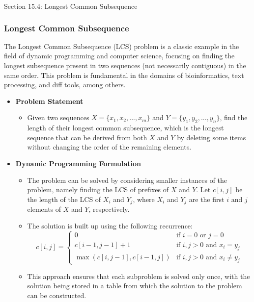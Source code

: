 \begin{notes}{Section 15.4: Longest Common Subsequence}
    \subsubsection*{Longest Common Subsequence}

    The Longest Common Subsequence (LCS) problem is a classic example in the field of dynamic programming and computer science, focusing on finding the longest subsequence present in two sequences 
    (not necessarily contiguous) in the same order. This problem is fundamental in the domains of bioinformatics, text processing, and diff tools, among others.
    
    \begin{itemize}
        \item \textbf{Problem Statement}
        \begin{itemize}
            \item Given two sequences $X = \{x_1, x_2, ..., x_m\}$ and $Y = \{y_1, y_2, ..., y_n\}$, find the length of their longest common subsequence, which is the longest sequence that can be 
            derived from both $X$ and $Y$ by deleting some items without changing the order of the remaining elements.
        \end{itemize}
        
        \item \textbf{Dynamic Programming Formulation}
        \begin{itemize}
            \item The problem can be solved by considering smaller instances of the problem, namely finding the LCS of prefixes of $X$ and $Y$. Let $c[i, j]$ be the length of the LCS of $X_i$ and 
            $Y_j$, where $X_i$ and $Y_j$ are the first $i$ and $j$ elements of $X$ and $Y$, respectively.
            \item The solution is built up using the following recurrence:
            \begin{equation*}
                c[i, j] = 
                \begin{cases} 
                0 & \text{if } i = 0 \text{ or } j = 0 \\
                c[i-1, j-1] + 1 & \text{if } i, j > 0 \text{ and } x_i = y_j \\
                \max(c[i, j-1], c[i-1, j]) & \text{if } i, j > 0 \text{ and } x_i \neq y_j
                \end{cases}
            \end{equation*}
            \item This approach ensures that each subproblem is solved only once, with the solution being stored in a table from which the solution to the problem can be constructed.
        \end{itemize}
        

\end{itemize}
\end{notes}
